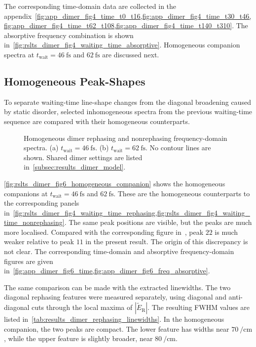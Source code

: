 The corresponding time-domain data are collected in the appendix~\cref{fig:app_dimer_fig4_time_t0_t16,fig:app_dimer_fig4_time_t30_t46,fig:app_dimer_fig4_time_t62_t108,fig:app_dimer_fig4_time_t140_t310}. The absorptive frequency combination is shown in~\autoref{fig:rslts_dimer_fig4_waiting_time_absorptive}. Homogeneous companion spectra at \(t_{\mathrm{wait}}=\SI{46}{\femto\second}\) and \(\SI{62}{\femto\second}\) are discussed next.

\subsection{Homogeneous Peak-Shapes}
\label{subsec:results_dimer_homogeneous_peak_shape}

To separate waiting-time line-shape changes from the diagonal broadening caused by static disorder, selected inhomogeneous spectra from the previous waiting-time sequence are compared with their homogeneous counterparts.

\begin{figure}[htbp]
  \centering
\caption{Homogeneous dimer rephasing and nonrephasing frequency-domain spectra. (a)
\(t_{\mathrm{wait}}=\SI{46}{\femto\second}\). (b)
\(t_{\mathrm{wait}}=\SI{62}{\femto\second}\). No contour lines are shown. Shared dimer settings are listed
in~\autoref{subsec:results_dimer_model}.}
  \label{fig:rslts_dimer_fig6_homogeneous_companion}
\end{figure}

\autoref{fig:rslts_dimer_fig6_homogeneous_companion} shows the homogeneous companions at \(t_{\mathrm{wait}}=\SI{46}{\femto\second}\) and \(\SI{62}{\femto\second}\). These are the homogeneous counterparts to the corresponding panels in~\cref{fig:rslts_dimer_fig4_waiting_time_rephasing,fig:rslts_dimer_fig4_waiting_time_nonrephasing}. The same peak positions are visible, but the peaks are much more localised. Compared with the corresponding figure in~\cite{pisliakovetal2006twodimensionalopticalthreepulse}, peak \(22\) is much weaker relative to peak \(11\) in the present result. The origin of this discrepancy is not clear. The corresponding time-domain and absorptive frequency-domain figures are given in~\cref{fig:app_dimer_fig6_time,fig:app_dimer_fig6_freq_absorptive}.

The same comparison can be made with the extracted linewidths. The two diagonal rephasing features were measured separately, using diagonal and anti-diagonal cuts through the local maxima of \(|\tilde{E}_{\mathrm{R}}|\). The resulting FWHM values are listed in~\autoref{tab:results_dimer_rephasing_linewidths}. In the homogeneous companion, the two peaks are compact. The lower feature has widths near \(\SI{70}{\per\centi\metre}\), while the upper feature is slightly broader, near \(\SI{80}{\per\centi\metre}\).

